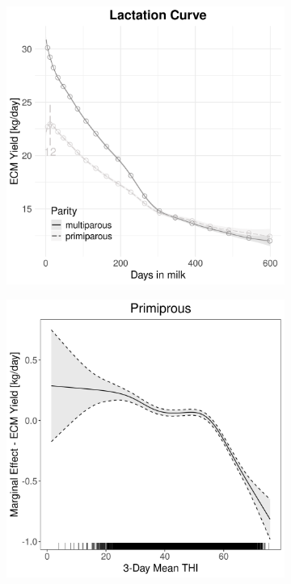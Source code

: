 \begin{figure}[H]
\begin{subfigure}[b]{0.45\textwidth}
        \includegraphics[width=\textwidth]{thesis/figures/models/ecm/after2010/si_ecm_after2010/si_ecm_after2010_marginal_dim_milk_combined.png}
    \end{subfigure}
    \begin{subfigure}[b]{0.45\textwidth}
        \centering
        \includegraphics[width=\textwidth]{thesis/figures/models/ecm/after2010/si_ecm_after2010/si_ecm_after2010_marginal_thi_milk_primi.png}

\end{subfigure}
\end{figure}

